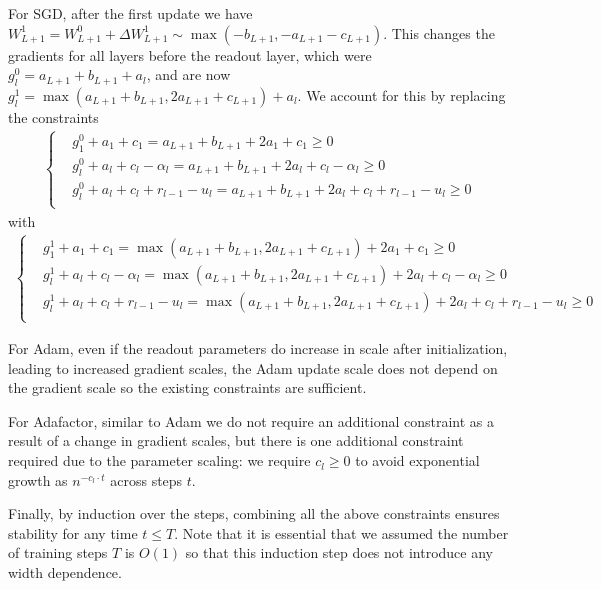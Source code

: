 For SGD, after the first update we have $W_{L+1}^1 = W_{L+1}^0 + \Delta W_{L+1}^1 \sim \max(-b_{L+1}, -a_{L+1} - c_{L+1})$. This changes the gradients for all layers before the readout layer, which were $g_l^0 = a_{L+1} + b_{L+1} + a_l$, and are now $g_l^1 = \max(a_{L+1} + b_{L+1}, 2a_{L+1} + c_{L+1}) + a_l$. We account for this by replacing the constraints
\begin{align*}
    \begin{cases}
    &g_1^0 + a_1 + c_1 = a_{L+1} + b_{L+1} + 2a_1 + c_1 \geq 0\\
    &g_l^0 + a_l + c_l - \alpha_l = a_{L+1} + b_{L+1} + 2a_l + c_l - \alpha_l \geq 0\\
    &g_l^0 + a_l + c_l + r_{l-1} - u_l = a_{L+1} + b_{L+1} + 2a_l + c_l + r_{l-1} - u_l \geq 0\\
    \end{cases}
\end{align*}
with 
\begin{align*}
    \begin{cases}
    &g_1^1 + a_1 + c_1 = \max(a_{L+1} + b_{L+1}, 2a_{L+1} + c_{L+1}) + 2a_1 + c_1 \geq 0\\
    &g_l^1 + a_l + c_l - \alpha_l = \max(a_{L+1} + b_{L+1}, 2a_{L+1} + c_{L+1}) + 2a_l + c_l - \alpha_l \geq 0\\
    &g_l^1 + a_l + c_l + r_{l-1} - u_l = \max(a_{L+1} + b_{L+1}, 2a_{L+1} + c_{L+1}) + 2a_l + c_l + r_{l-1} - u_l \geq 0\\
    \end{cases}
\end{align*}

For Adam, even if the readout parameters do increase in scale after initialization, leading to increased gradient scales, the Adam update scale does not depend on the gradient scale so the existing constraints are sufficient.

For Adafactor, similar to Adam we do not require an additional constraint as a result of a change in gradient scales, but there is one additional constraint required due to the parameter scaling: we require $c_{l} \geq 0$ to avoid exponential growth as $n^{-c_{l} \cdot t}$ across steps $t$.

Finally, by induction over the steps, combining all the above constraints ensures stability for any time $t \leq T$. Note that it is essential that we assumed the number of training steps $T$ is $O(1)$ so that this induction step does not introduce any width dependence.

